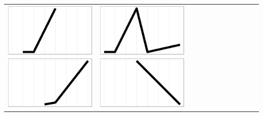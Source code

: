 \documentclass[conference]{worldcomp}
\begin{document}
\begin{table}
\begin{tabular}{ | b{1.5cm} | c | c | c | c | c | c | c | c | c | c | c |}
 \includegraphics[scale=0.08]{figures/bbcb.ps} &  
 \includegraphics[scale=0.08]{figures/bbbb.ps} &  

\end{tabular}
\end{table}
\end{document}
